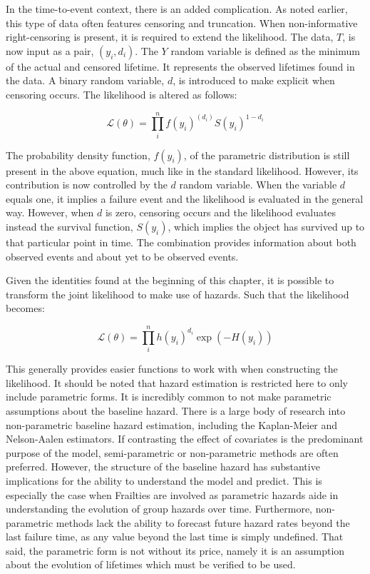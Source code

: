 In the time-to-event context, there is an added complication. As noted earlier, this type of data often features censoring and truncation. When non-informative right-censoring is present, it is required to extend the likelihood. The data, $T$, is now input as a pair, $(y_i, d_i)$. The $Y$ random variable is defined as the minimum of the actual and censored lifetime. It represents the observed lifetimes found in the data. A binary random variable, $d$, is introduced to make explicit when censoring occurs. The likelihood is altered as follows:

$$ \mathcal {L}(\theta) = \prod^n_i f(y_i)^{(d_i)} S(y_i)^{1 - d_i} $$

The probability density function, $f(y_i)$, of the parametric distribution is still present in the above equation, much like in the standard likelihood. However, its contribution is now controlled by the $d$ random variable. When the variable $d$ equals one, it implies a failure event and the likelihood is evaluated in the general way. However, when $d$ is zero,  censoring occurs and the likelihood evaluates instead the survival function, $S(y_i)$, which implies the object has survived up to that particular point in time. The combination provides information about both observed events and about yet to be observed events. 

Given the identities found at the beginning of this chapter, it is possible to transform the joint likelihood to make use of hazards.  Such that the likelihood becomes:

$$ \mathcal {L}(\theta) = \prod^n_i h(y_i)^{d_i} \exp(-H(y_i)) $$

This generally provides easier functions to work with when constructing the likelihood. It should be noted that hazard estimation is restricted here to only include parametric forms. It is incredibly common to not make parametric assumptions about the baseline hazard. There is a large body of research into non-parametric baseline hazard estimation, including the Kaplan-Meier and Nelson-Aalen estimators. If contrasting the effect of covariates is the predominant purpose of the model, semi-parametric or non-parametric methods are often preferred. However, the structure of the baseline hazard has substantive implications for the ability to understand the model and predict. This is especially the case when Frailties are involved as parametric hazards aide in understanding the evolution of group hazards over time. Furthermore, non-parametric methods lack the ability to forecast future hazard rates beyond the last failure time, as any value beyond the last time is simply undefined. That said, the parametric form is not without its price, namely it is an assumption about the evolution of lifetimes which must be verified to be used.

